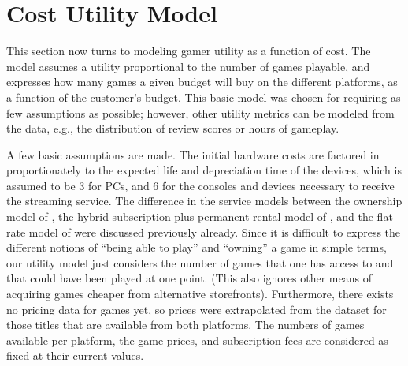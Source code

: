 \section{Cost Utility Model}
\label{sec:utilitymodel}

This section now turns to modeling gamer utility as a function
of cost. The model assumes a utility proportional to the number
of games playable, and expresses how many games a given budget will
buy on the different platforms, as a function of the customer's
budget. This basic model was chosen for requiring as few assumptions
as possible;
however, other utility metrics can be modeled from the data,
e.g., the distribution of review scores or hours of
gameplay.

A few basic assumptions are made. The initial hardware costs are
factored in proportionately to the expected life and depreciation time
of the devices, which is assumed to be \SI{3}{\year} for PCs, and
\SI{6}{\year} for the consoles and devices necessary to receive the
streaming service.
The difference in the service models between the ownership model of
\steam, the hybrid subscription plus permanent rental model of \gfnow,
and the flat rate model of \psnow were discussed previously already.
Since it is difficult to express the different notions of ``being able
to play'' and ``owning'' a game in simple terms, our utility model just
considers the number of games that one has access to and that could have
been played at one point. (This also ignores other means of acquiring
games cheaper from alternative storefronts).
Furthermore, there exists no pricing data for \gfnow games yet,
so prices were extrapolated from the \steam dataset for those
titles that are available from both platforms.
The numbers of games available per platform, the game prices,
and subscription fees are considered as fixed at their current values.


